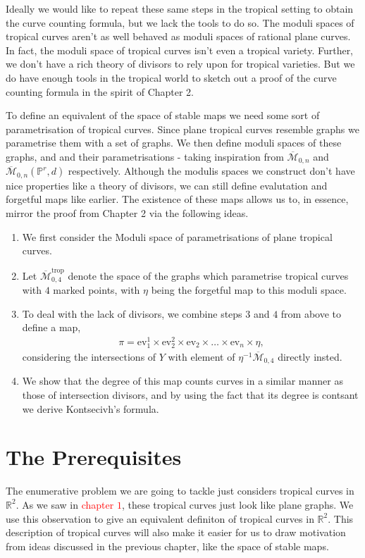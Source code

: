 Ideally we would like to repeat these same steps in the tropical setting to obtain the curve counting formula, but we lack the tools to do so.
The moduli spaces of tropical curves aren't as well behaved as moduli spaces of rational plane curves.
In fact, the moduli space of tropical curves isn't even a tropical variety.
Further, we don't have a rich theory of divisors to rely upon for tropical varieties. 
But we do have enough tools in the tropical world to sketch out a proof of the curve counting formula in the spirit of Chapter 2.
\par To define an equivalent of the space of stable maps we need some sort of parametrisation of tropical curves. 
Since plane tropical curves resemble graphs we parametrise them with a set of graphs.
We then define moduli spaces of these graphs, and and their parametrisations - taking inspiration from $\overline{\mathcal{M}}_{0,n}$ and $\overline{\mathcal{M}}_{0,n}(\mathbb{P}^{r},d)$ respectively.
Although the modulis spaces we construct don't have nice properties like a theory of divisors, we can still define evalutation and forgetful maps like earlier.
The existence of these maps allows us to, in essence, mirror the proof from Chapter 2 via the following ideas.
\begin{enumerate}
    \item We first consider the Moduli space of parametrisations of plane tropical curves.
    \item Let $\overline{\mathcal{M}}_{0,4}^{\text{trop}}$ denote the space of the graphs which parametrise tropical curves with $4$ marked points, with $\eta$ being the forgetful map to this moduli space.
    \item To deal with the lack of divisors, we combine steps $3$ and $4$ from above to define a map,
        \begin{align*}
            \pi = \text{ev}_{1}^{1} \times \text{ev}_{2}^{2} \times \text{ev}_{2} \times \dots \times \text{ev}_{n} \times \eta,
        \end{align*}
        considering the intersections of $Y$ with element of $\eta^{-1}\overline{\mathcal{M}}_{0,4}$ directly insted.
    \item We show that the degree of this map counts curves in a similar manner as those of intersection divisors, and by using the fact that its degree is contsant we derive Kontsecivh's formula.
\end{enumerate}

\section{The Prerequisites}
The enumerative problem we are going to tackle just considers tropical curves in $\mathbb{R}^{2}$.
As we saw in \textcolor{red}{chapter $1$}, these tropical curves just look like plane graphs.
We use this observation to give an equivalent definiton of tropical curves in $\mathbb{R}^{2}$.
This description of tropical curves will also make it easier for us to draw motivation from ideas discussed in the previous chapter, like the space of stable maps.


